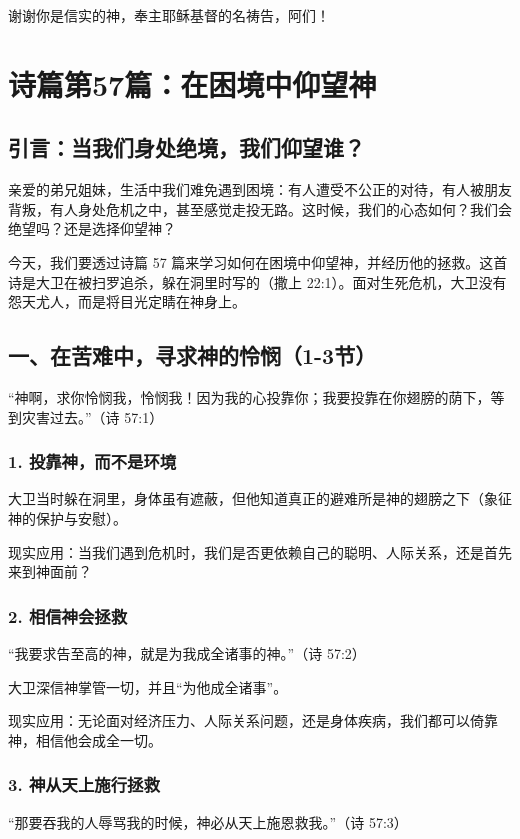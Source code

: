 \documentclass[a4paper, 12pt]{article}
\begin{document}
谢谢你是信实的神，奉主耶稣基督的名祷告，阿们！
\newpage
\section{诗篇第57篇：在困境中仰望神}
\subsection*{引言：当我们身处绝境，我们仰望谁？}
\hspace{0.6cm}亲爱的弟兄姐妹，生活中我们难免遇到困境：有人遭受不公正的对待，有人被朋友背叛，有人身处危机之中，甚至感觉走投无路。这时候，我们的心态如何？我们会绝望吗？还是选择仰望神？

今天，我们要透过诗篇 57 篇来学习如何在困境中仰望神，并经历他的拯救。这首诗是大卫在被扫罗追杀，躲在洞里时写的（撒上 22:1）。面对生死危机，大卫没有怨天尤人，而是将目光定睛在神身上。

\subsection*{一、在苦难中，寻求神的怜悯（1-3节）}
“神啊，求你怜悯我，怜悯我！因为我的心投靠你；我要投靠在你翅膀的荫下，等到灾害过去。”（诗 57:1）

\subsubsection*{1. 投靠神，而不是环境}
\hspace{0.6cm}大卫当时躲在洞里，身体虽有遮蔽，但他知道真正的避难所是神的翅膀之下（象征神的保护与安慰）。

现实应用：当我们遇到危机时，我们是否更依赖自己的聪明、人际关系，还是首先来到神面前？
\subsubsection*{2. 相信神会拯救}
“我要求告至高的神，就是为我成全诸事的神。”（诗 57:2）

大卫深信神掌管一切，并且“为他成全诸事”。

现实应用：无论面对经济压力、人际关系问题，还是身体疾病，我们都可以倚靠神，相信他会成全一切。
\subsubsection*{3. 神从天上施行拯救}
“那要吞我的人辱骂我的时候，神必从天上施恩救我。”（诗 57:3）
\end{document}
